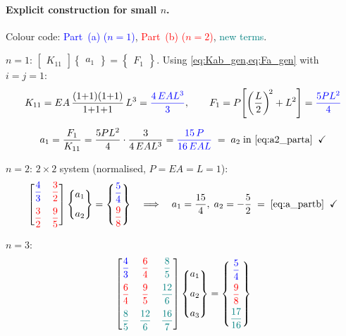 \documentclass[11pt, a4paper]{article}
\begin{document}
\paragraph{Explicit construction for small $n$.}
Colour code: \textcolor{blue}{Part~(a) ($n=1$)}, \textcolor{red}{Part~(b) ($n=2$)}, \textcolor{teal}{new terms}.

\medskip
$n=1$: $\begin{bmatrix} K_{11} \end{bmatrix} \begin{Bmatrix} a_1 \end{Bmatrix} = \begin{Bmatrix} F_1 \end{Bmatrix}$.  Using \cref{eq:Kab_gen,eq:Fa_gen} with $i=j=1$:
\begin{gather*}
K_{11}=EA\,\frac{(1{+}1)(1{+}1)}{1{+}1{+}1}\,L^{3}
      =\textcolor{blue}{\frac{4\,EAL^3}{3}},\qquad
F_1=P\!\left[\left(\frac{L}{2}\right)^{\!2}+L^2\right]
   =\textcolor{blue}{\frac{5PL^2}{4}}\\[6pt]
a_1=\frac{F_1}{K_{11}}
   =\frac{5PL^2}{4}\cdot\frac{3}{4\,EAL^3}
   =\textcolor{blue}{\frac{15\,P}{16\,EAL}}
   \;=\;a_2\;\text{in \cref{eq:a2_parta}}\;\;\checkmark
\end{gather*}

$n=2$: $2\times 2$ system (normalised, $P{=}EA{=}L{=}1$):
\[
\begin{bmatrix}
\textcolor{blue}{\dfrac{4}{3}} & \textcolor{red}{\dfrac{3}{2}}\\[10pt]
\textcolor{red}{\dfrac{3}{2}} & \textcolor{red}{\dfrac{9}{5}}
\end{bmatrix}
\begin{Bmatrix}a_1\\[8pt]a_2\end{Bmatrix}
=\begin{Bmatrix}\textcolor{blue}{\dfrac{5}{4}}\\[8pt]\textcolor{red}{\dfrac{9}{8}}\end{Bmatrix}
\quad\Longrightarrow\quad
a_1=\frac{15}{4},\;a_2=-\frac{5}{2}
\;=\;\text{\cref{eq:a_partb}}\;\;\checkmark
\]

$n=3$:
\[
\begin{bmatrix}
\textcolor{blue}{\dfrac{4}{3}} & \textcolor{red}{\dfrac{6}{4}} & \textcolor{teal}{\dfrac{8}{5}}\\[10pt]
\textcolor{red}{\dfrac{6}{4}} & \textcolor{red}{\dfrac{9}{5}} & \textcolor{teal}{\dfrac{12}{6}}\\[10pt]
\textcolor{teal}{\dfrac{8}{5}} & \textcolor{teal}{\dfrac{12}{6}} & \textcolor{teal}{\dfrac{16}{7}}
\end{bmatrix}
\begin{Bmatrix}a_1\\[8pt]a_2\\[8pt]a_3\end{Bmatrix}
=\begin{Bmatrix}\textcolor{blue}{\dfrac{5}{4}}\\[8pt]\textcolor{red}{\dfrac{9}{8}}\\[8pt]\textcolor{teal}{\dfrac{17}{16}}\end{Bmatrix}
\]
\end{document}
